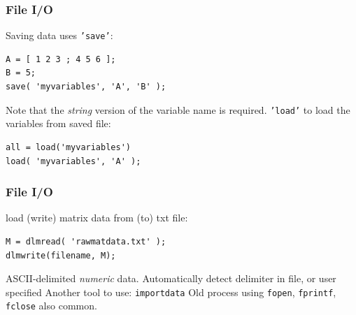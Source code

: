 \documentclass[11pt]{beamer}
\begin{document}
\begin{frame}[fragile]
  \frametitle{File I/O}
  \Enlarge

  \begin{enumerate}
  \myitem  Saving data uses \texttt{'save'}:
  \begin{Verbatim}
A = [ 1 2 3 ; 4 5 6 ];
B = 5;
save( 'myvariables', 'A', 'B' );
  \end{Verbatim}
  \end{enumerate}
  \begin{enumerate}
  \myitem  Note that the \emph{string} version of the variable name is required. \pause
  \myitem  \texttt{'load'} to load the variables from saved file:
  \begin{Verbatim}
all = load('myvariables')
load( 'myvariables', 'A' );
  \end{Verbatim}
  \end{enumerate}
\end{frame}

\begin{frame}[fragile]
  \frametitle{File I/O}
  \Enlarge

  \begin{enumerate}
  \myitem  load (write) matrix data from (to) txt file: 
  \begin{Verbatim}
M = dlmread( 'rawmatdata.txt' );
dlmwrite(filename, M);
  \end{Verbatim}
  \end{enumerate}
  \pause
  \begin{enumerate}
  \myitem  ASCII-delimited \emph{numeric} data. 
  \myitem  Automatically detect delimiter in file, or user specified \pause
  \myitem  Another tool to use: \texttt{importdata} \pause
  \myitem  Old process using \texttt{fopen}, \texttt{fprintf}, \texttt{fclose} also common.
  \end{enumerate}
\end{frame}

\end{document}
